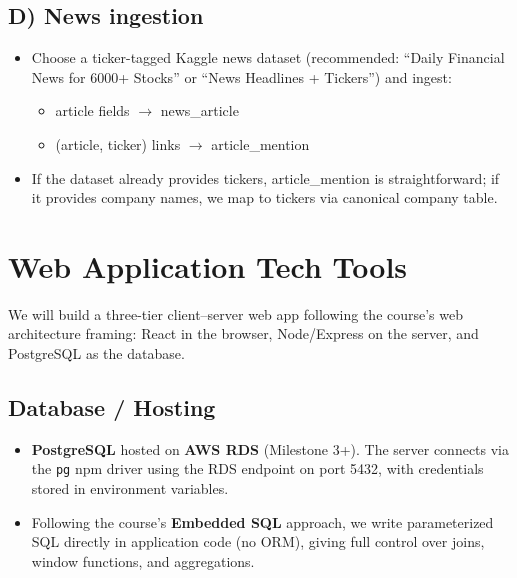 \documentclass[11pt]{article}
\begin{document}
\subsection{D) News ingestion}

\begin{itemize}
    \item Choose a ticker-tagged Kaggle news dataset (recommended: ``Daily Financial News for 6000+ Stocks'' or ``News Headlines + Tickers'') and ingest:
    \begin{itemize}
        \item article fields $\rightarrow$ news\_article
        \item (article, ticker) links $\rightarrow$ article\_mention
    \end{itemize}
    \item If the dataset already provides tickers, article\_mention is straightforward; if it provides company names, we map to tickers via canonical company table.
\end{itemize}

\newpage
\section{Web Application Tech Tools}

We will build a three-tier client--server web app following the course's web architecture framing: React in the browser, Node/Express on the server, and PostgreSQL as the database.

\subsection{Database / Hosting}
\begin{itemize}
    \item \textbf{PostgreSQL} hosted on \textbf{AWS RDS} (Milestone 3+). The server connects via the \texttt{pg} npm driver using the RDS endpoint on port 5432, with credentials stored in environment variables.
    \item Following the course's \textbf{Embedded SQL} approach, we write parameterized SQL directly in application code (no ORM), giving full control over joins, window functions, and aggregations.
\end{itemize}
\end{document}
